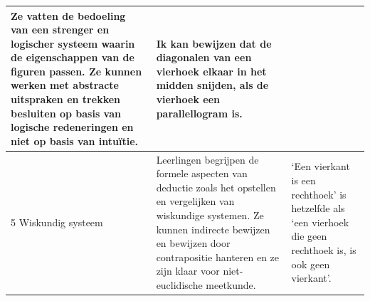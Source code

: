 \begin{tabel}
\begin{tabular}{|m{2.5cm}|m{9cm}|m{3cm}|}
        Ze vatten de bedoeling van een strenger en logischer systeem waarin de eigenschappen van de figuren passen.
        Ze kunnen werken met abstracte uitspraken en trekken besluiten op basis van logische redeneringen en niet op basis van intuïtie. & Ik kan bewijzen dat de diagonalen van een vierhoek elkaar in het midden snijden, als de vierhoek een parallellogram is.\\ 
		\hline\rowcolor{white}
		5 Wiskundig systeem  & Leerlingen begrijpen de formele aspecten van deductie zoals het opstellen en vergelijken van wiskundige systemen.
        Ze kunnen indirecte bewijzen en bewijzen door contrapositie hanteren en ze zijn klaar voor niet-euclidische meetkunde. & `Een vierkant is een rechthoek' is hetzelfde als `een vierhoek die geen rechthoek is, is ook geen vierkant'.\\
		\hline
	\end{tabular}
	\caption{Van Hiele theorie}\label{tab:vanhiele}
\end{tabel}

